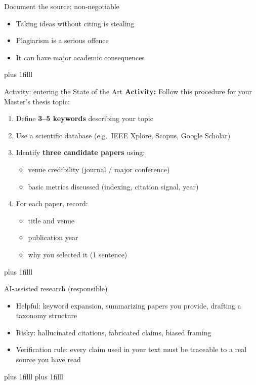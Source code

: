 \documentclass[aspectratio=169]{beamer}
\newcommand{\btVFill}{\vskip0pt plus 1filll}
\newcommand{\Activity}[1]{\textbf{Activity:} #1}
\begin{document}
\begin{frame}{Document the source: non-negotiable}
  \begin{itemize}
    \item Taking ideas without citing is stealing
    \item Plagiarism is a serious offence
    \item It can have major academic consequences
  \end{itemize}
 \btVFill
\end{frame}

\begin{frame}{Activity: entering the State of the Art}
  \Activity{
  Follow this procedure for your Master's thesis topic:
  \begin{enumerate}
    \item Define \textbf{3--5 keywords} describing your topic
    \item Use a scientific database (e.g.\ IEEE Xplore, Scopus, Google Scholar)
    \item Identify \textbf{three candidate papers} using:
      \begin{itemize}
        \item venue credibility (journal / major conference)
        \item basic metrics discussed (indexing, citation signal, year)
      \end{itemize}
    \item For each paper, record:
      \begin{itemize}
        \item title and venue
        \item publication year
        \item why you selected it (1 sentence)
      \end{itemize}
  \end{enumerate}
  }
  \btVFill
\end{frame}

\begin{frame}{AI-assisted research (responsible)}
  \begin{itemize}
    \item Helpful: keyword expansion, summarizing papers you provide, drafting a taxonomy structure
    \item Risky: hallucinated citations, fabricated claims, biased framing
    \item Verification rule: every claim used in your text must be traceable to a real source you have read
  \end{itemize}
  \btVFill
\btVFill\end{frame}
\end{document}
